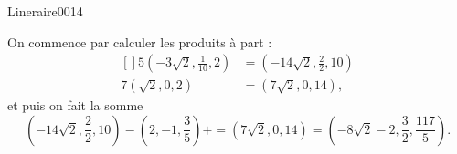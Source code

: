 \begin{corrige}{Lineraire0014}

	On commence par calculer les produits à part :
	\begin{equation}
		\begin{aligned}[]
			5(-3\sqrt{2},\frac{1}{ 10 },2)&=(-14\sqrt{2},\frac{ 2 }{2},10)\\
			7(\sqrt{2},0,2)&=(7\sqrt{2},0,14),
		\end{aligned}
	\end{equation}
	et puis on fait la somme
	\begin{equation}
		(-14\sqrt{2},\frac{ 2 }{2},10)-(2,-1,\frac{ 3 }{ 5 })+=(7\sqrt{2},0,14)=(-8\sqrt{2}-2,\frac{ 3 }{ 2 },\frac{ 117 }{ 5 }).
	\end{equation}

\end{corrige}
